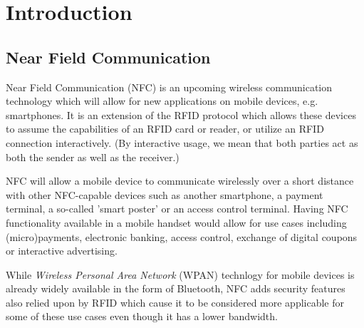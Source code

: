 \section{Introduction}


\subsection{Near Field Communication} %
Near Field Communication (NFC) is an upcoming wireless communication technology which will allow for new applications on mobile devices, e.g. smartphones.
It is an extension of the RFID protocol which allows these devices to assume the capabilities of an RFID card or reader, or utilize an RFID connection interactively.
(By interactive usage, we mean that both parties act as both the sender as well as the receiver.)
 
NFC will allow a mobile device to communicate wirelessly over a short distance with other NFC-capable devices such as another smartphone, a payment terminal, a so-called 'smart poster' or an access control terminal.
Having NFC functionality available in a mobile handset would allow for use cases including (micro)payments, electronic banking, access control, exchange of digital coupons or interactive advertising.

While \textit{Wireless Personal Area Network} (WPAN) technlogy for mobile devices is already widely available in the form of Bluetooth, NFC adds security features also relied upon by RFID which cause it to be considered more applicable for some of these use cases even though it has a lower bandwidth.



